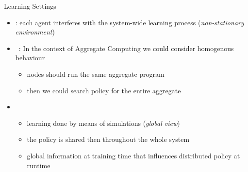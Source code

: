 \documentclass[8pt, aspectratio=169, handout]{beamer}
\begin{document}
\begin{frame}{Learning Settings}
  \begin{cardTiny}
    \begin{itemize}
      \item {}: each agent interferes with the system-wide learning process (\emph{non-stationary environment})
      \item {}~\cite{DBLP:journals/aamas/PanaitL05}: In the context of Aggregate Computing we could consider homogenous behaviour
      \begin{itemize}
        \item nodes should run the same aggregate program
        \item then we could search  policy for the entire aggregate
      \end{itemize}
      \item {}~\cite{DBLP:phd/ethos/Foerster18}
      \begin{itemize}
        \item learning done by means of simulations (\emph{global view})
        \item the policy is shared then throughout the whole system
        \item[\faThumbsUp] global information at training time that influences distributed policy at runtime
      \end{itemize}
    \end{itemize}
  \end{cardTiny}
  \centering
\end{frame}
\end{document}
